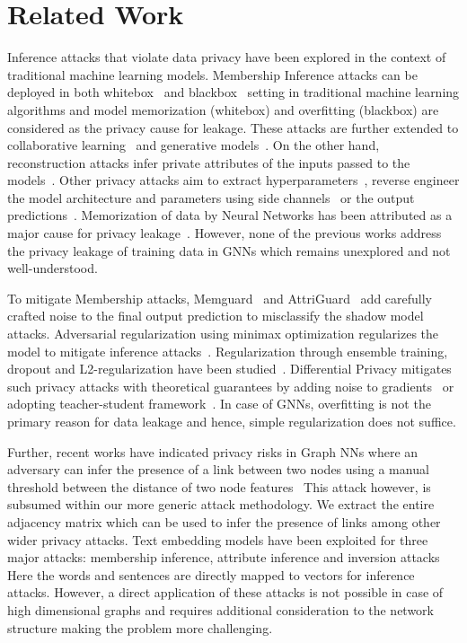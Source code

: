 \section{Related Work}\label{related}


Inference attacks that violate data privacy have been explored in the context of traditional machine learning models.
Membership Inference attacks can be deployed in both whitebox~\cite{8835245} and blackbox~\cite{7958568} setting in traditional machine learning algorithms and model memorization (whitebox) and overfitting (blackbox) are considered as the privacy cause for leakage.
These attacks are further extended to collaborative learning~\cite{8835245,DBLP:conf/sp/MelisSCS19} and generative models~\cite{logan}.
On the other hand, reconstruction attacks infer private attributes of the inputs passed to the models~\cite{247690,DBLP:journals/corr/abs-1907-00164,10.1145/3243734.3243834,10.1504/IJSN.2015.071829,10.1145/2810103.2813677}.
Other privacy attacks aim to extract hyperparameters~\cite{8418595}, reverse engineer the model architecture and parameters using side channels~\cite{236204} or the output predictions~\cite{10.5555/3241094.3241142}.
Memorization of data by Neural Networks has been attributed as a major cause for privacy leakage~\cite{memorize,secretsharer,overlearninginf}.
However, none of the previous works address the privacy leakage of training data in GNNs which remains unexplored and not well-understood.

To mitigate Membership attacks, Memguard~\cite{10.1145/3319535.3363201} and AttriGuard~\cite{217523} add carefully crafted noise to the final output prediction to misclassify the shadow model attacks.
Adversarial regularization using minimax optimization regularizes the model to mitigate inference attacks~\cite{10.1145/3243734.3243855}.
Regularization through ensemble training, dropout and L2-regularization have been studied~\cite{ndss19salem}.
Differential Privacy mitigates such privacy attacks with theoretical guarantees by adding noise to gradients~\cite{10.1145/2976749.2978318} or adopting teacher-student framework~\cite{45828}.
In case of GNNs, overfitting is not the primary reason for data leakage and hence, simple regularization does not suffice.



Further, recent works have indicated privacy risks in Graph NNs where an adversary can infer the presence of a link between two nodes using a manual threshold between the distance of two node features~\cite{linksteal}
This attack however, is subsumed within our more generic attack methodology. We extract the entire adjacency matrix which can be used to infer the presence of links among other wider privacy attacks.
Text embedding models have been exploited for three major attacks: membership inference, attribute inference and inversion attacks~\cite{textembleak,nlp}
Here the words and sentences are directly mapped to vectors for inference attacks.
However, a direct application of these attacks is not possible in case of high dimensional graphs and requires additional consideration to the network structure making the problem more challenging.

